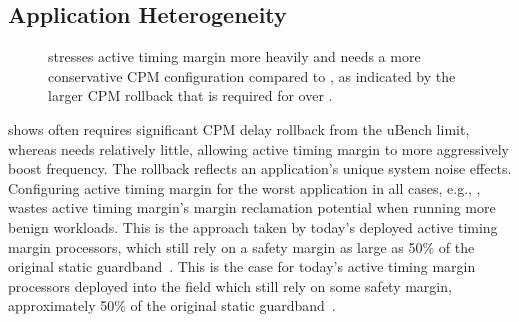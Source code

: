\subsection{Application Heterogeneity}
\label{sec:process:workload:heterogeneity}

\begin{figure}[t]
    \hfill
    \caption{ stresses active timing margin more heavily and needs a more conservative CPM configuration compared to , as indicated by the larger CPM rollback that is required for  over .}
    \label{fig:spec-limit-example} 
\end{figure}

 shows  often requires significant CPM delay rollback from the uBench limit, whereas  needs relatively little, allowing active timing margin to more aggressively boost frequency. The rollback reflects an application's unique system noise effects. Configuring active timing margin for the worst application in all cases, e.g., , wastes active timing margin's margin reclamation potential when running more benign workloads. This is the approach taken by today's deployed active timing margin processors, which still rely on a safety margin as large as 50\% of the original static guardband~\cite{lefurgy2011active}. This is the case for today's active timing margin processors deployed into the field which still rely on some safety margin, approximately 50\% of the original static guardband~\cite{lefurgy2011active}.

